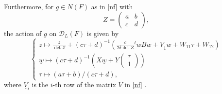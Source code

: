\documentclass[12pt, a4paper]{article}
\newcommand{\bsm}{\left ( \begin{smallmatrix} }
\newcommand{\esm}{\end{smallmatrix} \right )}
\newcommand{\dc}{\mathcal{D}}
\begin{document}
Furthermore, for $g\in N(F)$ as in \eqref{nf} with
\begin{equation*}
  Z=
  \begin{pmatrix}
    a & b\\
    c & d
  \end{pmatrix},
\end{equation*}
the action of $g$ on $\dc_L(F)$ is given by  
\begin{equation}\label{gaction}
  \begin{cases}
  z  \mapsto 
  \frac{z}{\det Z} + (c \tau + d)^{-1} \left( \frac{c}{2 \delta \det Z}{}^t \underline{w} B \underline{w}
  +\underline{V}_1\underline{w} + W_{11} \tau + W_{12} \right) \\
  \underline{w}  \mapsto  (c\tau+d)^{-1}
  ( X \underline{w} + Y 
  \bsm
    \tau \\ 1
    \esm
    )\\
    \tau  \mapsto  (a \tau + b)/(c \tau + d),
  \end{cases}
\end{equation}
where ${\underline V}_i$ is the $i$-th row of the matrix $V$ in \eqref{nf} \cite[Proposition 2.26]{GHSK3}\cite[p.259]{Kondo}.
\end{document}
